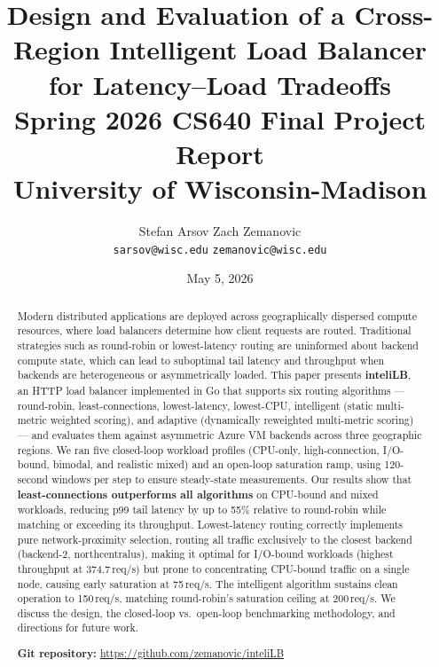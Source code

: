 \documentclass[12pt]{article}
\title{\textbf{Design and Evaluation of a Cross-Region Intelligent Load Balancer\\
for Latency--Load Tradeoffs}\\[0.5em]
\large Spring 2026 CS640 Final Project Report\\
University of Wisconsin-Madison}
\author{Stefan Arsov \quad Zach Zemanovic\\
\small\texttt{sarsov@wisc.edu} \quad \texttt{zemanovic@wisc.edu}}
\date{May 5, 2026}
\begin{document}
\maketitle

\begin{abstract}
Modern distributed applications are deployed across geographically dispersed
compute resources, where load balancers determine how client requests are
routed. Traditional strategies such as round-robin or lowest-latency routing
are uninformed about backend compute state, which can lead to suboptimal
tail latency and throughput when backends are heterogeneous or asymmetrically
loaded. This paper presents \textbf{inteliLB}, an HTTP load balancer
implemented in Go that supports six routing algorithms --- round-robin,
least-connections, lowest-latency, lowest-CPU, intelligent (static
multi-metric weighted scoring), and adaptive (dynamically reweighted
multi-metric scoring) --- and evaluates them against asymmetric Azure VM
backends across three geographic regions. We ran five closed-loop workload profiles
(CPU-only, high-connection, I/O-bound, bimodal, and realistic mixed) and an
open-loop saturation ramp, using 120-second windows per step to ensure
steady-state measurements. Our results show that
\textbf{least-connections outperforms all algorithms} on CPU-bound and mixed
workloads, reducing p99 tail latency by up to 55\% relative to round-robin
while matching or exceeding its throughput. Lowest-latency routing correctly
implements pure network-proximity selection, routing all traffic exclusively
to the closest backend (backend-2, northcentralus), making it optimal for
I/O-bound workloads (highest throughput at 374.7\,req/s) but prone to
concentrating CPU-bound traffic on a single node, causing early saturation
at 75\,req/s. The intelligent algorithm sustains clean operation to 150\,req/s,
matching round-robin's saturation ceiling at 200\,req/s. We discuss the
design, the closed-loop vs.\ open-loop benchmarking methodology, and
directions for future work.

\vspace{0.5em}
\noindent\textbf{Git repository:}
\url{https://github.com/zemanovic/inteliLB}
\end{abstract}

\tableofcontents
\newpage

\end{document}
